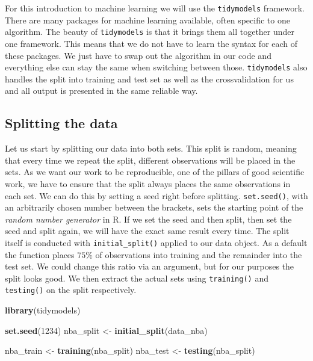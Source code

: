 \documentclass[
]{book}
\newenvironment{Shaded}{\begin{snugshade}}{\end{snugshade}}
\newcommand{\DecValTok}[1]{\textcolor[rgb]{0.00,0.00,0.81}{#1}}
\newcommand{\FunctionTok}[1]{\textcolor[rgb]{0.13,0.29,0.53}{\textbf{#1}}}
\newcommand{\NormalTok}[1]{#1}
\newcommand{\OtherTok}[1]{\textcolor[rgb]{0.56,0.35,0.01}{#1}}
\begin{document}
For this introduction to machine learning we will use the \texttt{tidymodels}
framework. There are many packages for machine learning available, often
specific to one algorithm. The beauty of \texttt{tidymodels} is that it brings them
all together under one framework. This means that we do not have to learn the
syntax for each of these packages. We just have to swap out the algorithm in
our code and everything else can stay the same when switching between those.
\texttt{tidymodels} also handles the split into training and test set as well as the
crossvalidation for us and all output is presented in the same reliable way.

\hypertarget{splitting-the-data}{%
\subsection{Splitting the data}\label{splitting-the-data}}

Let us start by splitting our data into both sets. This split is random, meaning
that every time we repeat the split, different observations will be placed in
the sets. As we want our work to be reproducible, one of the pillars of good
scientific work, we have to ensure that the split always places the same
observations in each set. We can do this by setting a seed right before
splitting. \texttt{set.seed()}, with an arbitrarily chosen number between the
brackets, sets the starting point of the \emph{random number generator} in R. If we
set the seed and then split, then set the seed and split again, we will have the
exact same result every time. The split itself is conducted with
\texttt{initial\_split()} applied to our data object. As a default the function places
\(75\%\) of observations into training and the remainder into the test set. We
could change this ratio via an argument, but for our purposes the split looks
good. We then extract the actual sets using \texttt{training()} and \texttt{testing()} on the
split respectively.

\begin{Shaded}
\begin{Highlighting}[]
\FunctionTok{library}\NormalTok{(tidymodels)}

\FunctionTok{set.seed}\NormalTok{(}\DecValTok{1234}\NormalTok{)}
\NormalTok{nba\_split }\OtherTok{\textless{}{-}} \FunctionTok{initial\_split}\NormalTok{(data\_nba)}

\NormalTok{nba\_train }\OtherTok{\textless{}{-}} \FunctionTok{training}\NormalTok{(nba\_split)}
\NormalTok{nba\_test }\OtherTok{\textless{}{-}} \FunctionTok{testing}\NormalTok{(nba\_split)}
\end{Highlighting}
\end{Shaded}
\end{document}
